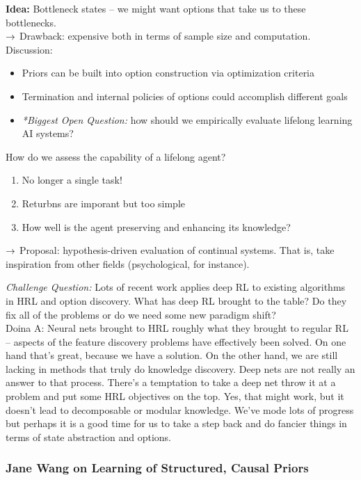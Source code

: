  {\bf Idea:} Bottleneck states -- we might want options that take us to these bottlenecks. \\
 
 $\rightarrow$ Drawback: expensive both in terms of sample size and computation. \\
 
Discussion:
\begin{itemize}
    \item Priors can be built into option construction via optimization criteria
    \item Termination and internal policies of options could accomplish different goals
    \item {\it **Biggest Open Question:} how should we empirically evaluate lifelong learning AI systems?
\end{itemize}

How do we assess the capability of a lifelong agent?
\begin{enumerate}
    \item No longer a single task!
    \item Returbns are imporant but too simple
    \item How well is the agent preserving and enhancing its knowledge?
\end{enumerate}

$\rightarrow$ Proposal: hypothesis-driven evaluation of continual systems. That is, take inspiration from other fields (psychological, for instance).


{\it Challenge Question:} Lots of recent work applies deep RL to existing algorithms in HRL and option discovery. What has deep RL brought to the table? Do they fix all of the problems or do we need some new paradigm shift? \\

Doina A: Neural nets brought to HRL roughly what they brought to regular RL -- aspects of the feature discovery problems have effectively been solved. On one hand that's great, because we have a solution. On the other hand, we are still lacking in methods that truly do knowledge discovery. Deep nets are not really an answer to that process. There's a temptation to take a deep net throw it at a problem and put some HRL objectives on the top. Yes, that might work, but it doesn't lead to decomposable or modular knowledge. We've mode lots of progress but perhaps it is a good time for us to take a step back and do fancier things in terms of state abstraction and options. 

\subsubsection{Jane Wang on Learning of Structured, Causal Priors}

